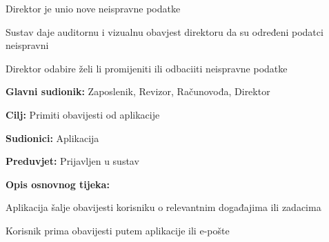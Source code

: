 \begin{packed_item}
\begin{packed_item}
\begin{packed_enum}
							\end{packed_enum}
							
							\item[7.b] Direktor je unio nove neispravne podatke
							\item[] \begin{packed_enum}
								
								\item Sustav daje auditornu i vizualnu obavjest direktoru da su određeni podatci neispravni
								\item Direktor odabire  želi li promijeniti ili odbaciiti neispravne podatke
								
							\end{packed_enum}
							
						\end{packed_item}
					\end{packed_item}
					
										
					\noindent {}
					\begin{packed_item}
						
						\item \textbf{Glavni sudionik: } Zaposlenik, Revizor, Računovođa, Direktor
						\item \textbf{Cilj:} Primiti obavijesti od aplikacije
						\item \textbf{Sudionici:} Aplikacija
						\item \textbf{Preduvjet:} Prijavljen u sustav
						\item \textbf{Opis osnovnog tijeka:}
						
						\item[] \begin{packed_enum}
							
							\item Aplikacija šalje obavijesti korisniku o relevantnim događajima ili zadacima
							\item Korisnik prima obavijesti putem aplikacije ili e-pošte
							
						\end{packed_enum}
					\end{packed_item}
					
